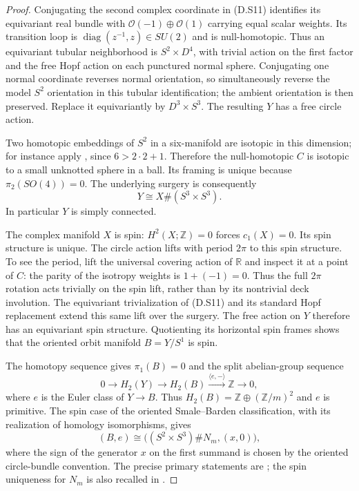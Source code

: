 \begin{proof}
Conjugating the second complex coordinate in (D.S11)
identifies its equivariant real bundle with
$\mathcal O(-1)\oplus\mathcal O(1)$ carrying equal
scalar weights. Its transition loop is
$\operatorname{diag}(z^{-1},z)\in SU(2)$ and is
null-homotopic. Thus an equivariant tubular neighborhood
is $S^2\times D^4$, with trivial action on the first
factor and the free Hopf action on each punctured
normal sphere. Conjugating one normal coordinate reverses
normal orientation, so simultaneously reverse the model
$S^2$ orientation in this tubular identification; the
ambient orientation is then preserved.
Replace it equivariantly by $D^3\times S^3$.
The resulting $Y$ has a free circle action.

Two homotopic embeddings of $S^2$ in a six-manifold
are isotopic in this dimension; for instance apply
\cite[Theorem 2.9]{manGR25}, since $6>2\cdot2+1$.
Therefore the null-homotopic $C$ is isotopic to a small
unknotted sphere in a ball. Its framing is unique because
$\pi_2(SO(4))=0$. The underlying surgery is consequently
\[
                         Y\cong X\#(S^3\times S^3).
 \tag{D.S12}
\]
In particular $Y$ is simply connected.

The complex manifold $X$ is spin: $H^2(X;\mathbb Z)=0$
forces $c_1(X)=0$. Its spin structure is unique.
The circle action lifts with period $2\pi$ to this spin
structure. To see the period, lift the universal covering
action of $\mathbb R$ and inspect it at a point of $C$:
the parity of the isotropy weights is $1+(-1)=0$.
Thus the full $2\pi$ rotation acts trivially on the spin
lift, rather than by its nontrivial deck involution.
The equivariant trivialization of (D.S11) and its standard
Hopf replacement extend this same lift over the surgery.
The free action on $Y$ therefore has an equivariant spin
structure. Quotienting its horizontal spin frames shows
that the oriented orbit manifold $B=Y/S^1$ is spin.

The homotopy sequence gives $\pi_1(B)=0$ and the split
abelian-group sequence
\[
 0\longrightarrow H_2(Y)\longrightarrow H_2(B)
       \xrightarrow{\langle e,-\rangle}\mathbb Z
       \longrightarrow0,
\]
where $e$ is the Euler class of $Y\to B$. Thus
$H_2(B)=\mathbb Z\oplus(\mathbb Z/m)^2$ and $e$ is
primitive. The spin case of the oriented Smale--Barden
classification, with its realization of homology
isomorphisms, gives
\[
 (B,e)\cong\bigl((S^2\times S^3)\#N_m,(x,0)\bigr),
 \tag{D.S13}
\]
where the sign of the generator $x$ on the first summand
is chosen by the oriented circle-bundle convention.
The precise primary statements are
\cite[Theorems 2.2--2.3]{manBarden65}; the spin uniqueness
for $N_m$ is also recalled in \cite[Section 4.3]{manReiser24}.


\end{proof}
